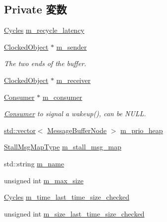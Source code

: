 \subsection*{Private 変数}
\begin{DoxyCompactItemize}
\item 
\hyperlink{classCycles}{Cycles} \hyperlink{classMessageBuffer_a896a9ceedfb77c22a82b490f05ae4624}{m\_\-recycle\_\-latency}
\item 
\hyperlink{classClockedObject}{ClockedObject} $\ast$ \hyperlink{classMessageBuffer_a8c9e563cbbe6ea97e8c1357a2dcce427}{m\_\-sender}
\begin{DoxyCompactList}\small\item\em The two ends of the buffer. \item\end{DoxyCompactList}\item 
\hyperlink{classClockedObject}{ClockedObject} $\ast$ \hyperlink{classMessageBuffer_a18393ec7ec37465d3c43d1de61fe7ea1}{m\_\-receiver}
\item 
\hyperlink{classConsumer}{Consumer} $\ast$ \hyperlink{classMessageBuffer_a138db353766834771d05a09ab273f245}{m\_\-consumer}
\begin{DoxyCompactList}\small\item\em \hyperlink{classConsumer}{Consumer} to signal a wakeup(), can be NULL. \item\end{DoxyCompactList}\item 
\hyperlink{classstd_1_1vector}{std::vector}$<$ \hyperlink{classMessageBufferNode}{MessageBufferNode} $>$ \hyperlink{classMessageBuffer_ab02596c3ecacf48c081c7188a2e304ab}{m\_\-prio\_\-heap}
\item 
\hyperlink{classMessageBuffer_a4f77caf961eb3357bbaa1534420e8213}{StallMsgMapType} \hyperlink{classMessageBuffer_a588564bc2c906eaf69f9b34f18ff18ea}{m\_\-stall\_\-msg\_\-map}
\item 
std::string \hyperlink{classMessageBuffer_adb41893ba19e889e56c559f25fc1a68a}{m\_\-name}
\item 
unsigned int \hyperlink{classMessageBuffer_ac6512ff5a4845e1c7accef18b576f810}{m\_\-max\_\-size}
\item 
\hyperlink{classCycles}{Cycles} \hyperlink{classMessageBuffer_a040f6bbf3cb647d2363ac247e2076126}{m\_\-time\_\-last\_\-time\_\-size\_\-checked}
\item 
unsigned int \hyperlink{classMessageBuffer_ad240a365b18b543a74ce40475a9e7d74}{m\_\-size\_\-last\_\-time\_\-size\_\-checked}
\item 

\end{DoxyCompactItemize}

